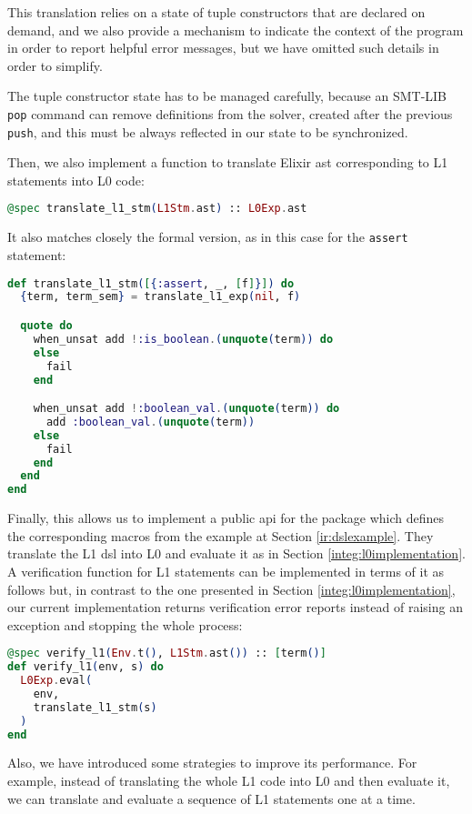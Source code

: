 This translation relies on a state of tuple constructors that are declared on 
demand, and we also provide a mechanism to indicate the context of the program 
in order to report helpful error messages, but we have omitted such details in 
order to simplify. 

The tuple constructor state has to be managed carefully, because an SMT-LIB
\verb|pop| command can remove definitions from the solver, created after the
previous \verb|push|, and this must be always reflected in our state to be 
synchronized.

Then, we also implement a function to translate Elixir \gls{ast} corresponding
to L1 statements into L0 code:

\begin{lstlisting}[language=elixir,numbers=none,frame=none]
@spec translate_l1_stm(L1Stm.ast) :: L0Exp.ast
\end{lstlisting}

It also matches closely the formal version, as in this case for the 
\verb|assert| statement:

\begin{lstlisting}[language=elixir,numbers=none,frame=none]
def translate_l1_stm([{:assert, _, [f]}]) do
  {term, term_sem} = translate_l1_exp(nil, f)

  quote do
    when_unsat add !:is_boolean.(unquote(term)) do
    else
      fail
    end

    when_unsat add !:boolean_val.(unquote(term)) do
      add :boolean_val.(unquote(term))
    else
      fail
    end
  end
end
\end{lstlisting}

Finally, this allows us to implement a public \gls{api} for the package which
defines the corresponding macros from the example at Section
\ref{ir:dslexample}. They translate the L1 \gls{dsl} into L0 and evaluate it as
in Section \ref{integ:l0implementation}. A verification function for L1
statements can be implemented in terms of it as follows but, in contrast to the
one presented in Section \ref{integ:l0implementation}, our current
implementation returns verification error reports instead of raising an
exception and stopping the whole process:

\begin{lstlisting}[language=elixir,numbers=none,frame=none]
@spec verify_l1(Env.t(), L1Stm.ast()) :: [term()]
def verify_l1(env, s) do
  L0Exp.eval(
    env,
    translate_l1_stm(s)
  )
end
\end{lstlisting}

Also, we have introduced some strategies to improve its performance. For
example, instead of translating the whole L1 code into L0 and then evaluate it,
we can translate and evaluate a sequence of L1 statements one at a time.
